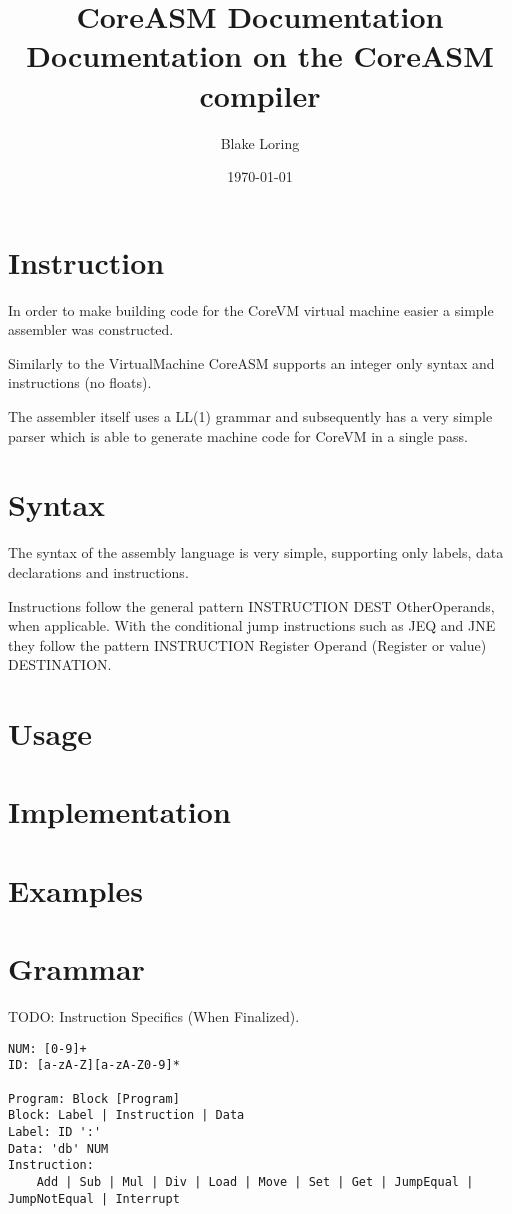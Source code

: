 \documentclass{article}
\title{CoreASM Documentation \\ \large Documentation on the CoreASM compiler}
\author{Blake Loring}
\date{\today}
\begin{document}
\maketitle

\section* {Instruction}

In order to make building code for the CoreVM virtual machine easier a simple assembler was constructed.

Similarly to the VirtualMachine CoreASM supports an integer only syntax and instructions (no floats).

The assembler itself uses a LL(1) grammar and subsequently has a very simple parser which is able to generate machine code for CoreVM in a single pass. 

\section* {Syntax}

The syntax of the assembly language is very simple, supporting only labels, data declarations and instructions.

Instructions follow the general pattern INSTRUCTION DEST OtherOperands, when applicable. With the conditional jump instructions
such as JEQ and JNE they follow the pattern INSTRUCTION Register Operand (Register or value) DESTINATION.

\section* {Usage}

\section* {Implementation}
\section* {Examples}
\section* {Grammar}

TODO: Instruction Specifics (When Finalized).

\begin{verbatim}
NUM: [0-9]+
ID: [a-zA-Z][a-zA-Z0-9]*

Program: Block [Program]
Block: Label | Instruction | Data
Label: ID ':'
Data: 'db' NUM
Instruction:
	Add | Sub | Mul | Div | Load | Move | Set | Get | JumpEqual | JumpNotEqual | Interrupt
\end{verbatim}
\end{document}
